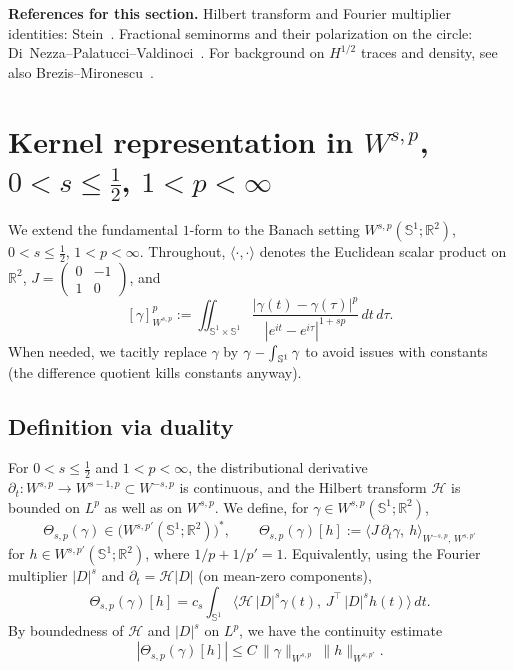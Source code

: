 \documentclass{amsart}
\newcommand{\dashint}{%
  \mathop{%
    \int
  }}
\newcounter{ex}
\newcounter{re}
\begin{document}
\medskip
\noindent\textbf{References for this section.}
Hilbert transform and Fourier multiplier identities: Stein~\cite{SteinSI}. Fractional seminorms and their polarization on the circle: Di~Nezza--Palatucci--Valdinoci~\cite{DiNezzaPV}. For background on $H^{1/2}$ traces and density, see also Brezis--Mironescu~\cite{BM1,BM2}.



\section{Kernel representation in $W^{s,p}$, $0<s\le \frac12$, $1<p<\infty$}

We extend the fundamental $1$-form to the Banach setting
$W^{s,p}(\mathbb S^1;\mathbb R^2)$, $0<s\le \tfrac12$, $1<p<\infty$.
Throughout, $\langle\cdot,\cdot\rangle$ denotes the Euclidean scalar product on $\mathbb R^2$,
$J=\left( \begin{array}{cc}0&-1\\ 1&0 \end{array} \right)$, and
\[
[\gamma]_{W^{s,p}}^p
:=\iint_{\mathbb S^1\times\mathbb S^1}
\frac{|\gamma(t)-\gamma(\tau)|^p}{|e^{it}-e^{i\tau}|^{1+sp}}\,dt\,d\tau .
\]
When needed, we tacitly replace $\gamma$ by $\gamma-\dashint_{\mathbb S^1}\gamma$
to avoid issues with constants (the difference quotient kills constants anyway).

\subsection{Definition via duality}
For $0<s\le \tfrac12$ and $1<p<\infty$, the distributional derivative
$\partial_t:W^{s,p}\to W^{s-1,p}\subset W^{-s,p}$ is continuous, and the Hilbert transform
$\mathcal H$ is bounded on $L^p$ as well as on $W^{s,p}$.
We define, for $\gamma\in W^{s,p}(\mathbb S^1;\mathbb R^2)$,
\begin{equation}\label{eq:Theta-sp-dual}
\Theta_{s,p}(\gamma)\in\big(W^{s,p'}(\mathbb S^1;\mathbb R^2)\big)^\ast,\qquad
\Theta_{s,p}(\gamma)[h]:=\big\langle J\,\partial_t\gamma,\ h\big\rangle_{W^{-s,p},\,W^{s,p'}}
\end{equation}
for $h\in W^{s,p'}(\mathbb S^1;\mathbb R^2)$, where $1/p+1/p'=1$.
Equivalently, using the Fourier multiplier $|D|^s$ and $\partial_t=\mathcal H|D|$ (on mean-zero components),
\begin{equation}\label{eq:Theta-sp-mult}
\Theta_{s,p}(\gamma)[h]
= c_s\int_{\mathbb S^1}\!\!
\big\langle \mathcal H\,|D|^{s}\gamma(t),\,J^\top\,|D|^{s}h(t)\big\rangle\,dt .
\end{equation}
By boundedness of $\mathcal H$ and $|D|^s$ on $L^p$, we have the continuity estimate
\begin{equation}\label{eq:Theta-sp-bound}
|\Theta_{s,p}(\gamma)[h]|
\le C\,\|\gamma\|_{W^{s,p}}\ \|h\|_{W^{s,p'}} .
\end{equation}
\end{document}
